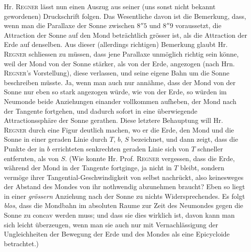 Hr. \textsc{Regner} lässt nun einen Auszug aus seiner (uns sonst nicht bekannt gewordenen) Druckschrift folgen. Das Wesentliche davon ist die Bemerkung, dass, wenn man die Parallaxe der Sonne zwischen $8''5$ und $8''9$ voraussetzt, die Attraction der Sonne auf den Mond beträchtlich grösser ist, als die Attraction der Erde auf denselben. Aus dieser (allerdings richtigen) Bemerkung glaubt Hr. \textsc{Regner} schliessen zu müssen, dass jene Parallaxe unmöglich richtig sein könne, weil der Mond von der Sonne stärker, als von der Erde, angezogen (nach Hrn. \textsc{Regner}'s Vorstellung), diese verlassen, und seine eigene Bahn um die Sonne beschreiben müsste. Ja, wenn man auch nur annähme, dass der Mond von der Sonne nur eben so stark angezogen würde, wie von der Erde, so würden im Neumonde beide Anziehungen einander vollkommen aufheben, der Mond nach der Tangente fortgehen, und dadurch sofort in eine überwiegende Attractionssphäre der Sonne gerathen. Diese letztere Behauptung will Hr. \textsc{Regner} durch eine Figur deutlich machen, wo er die Erde, den Mond und die Sonne in einer geraden Linie durch $T$, $b$, $S$ bezeichnet, und dann zeigt, dass die Punkte der in $b$ errichteten senkrechten geraden Linie sich von $T$ schneller entfernten, als von $S$. (Wie konnte Hr. Prof. \textsc{Regner} vergessen, dass die Erde, während der Mond in der Tangente fortginge, ja nicht in $T$ bleibt, sondern vermöge ihrer Tangential-Geschwindigkeit von selbst nachrückt, also keinesweges der Abstand des Mondes von ihr nothwendig abzunehmen braucht? Eben so liegt in einer \emph{grössern} Anziehung nach der Sonne zu nichts Widersprechendes. Es folgt \emph{blos}, dass die Mondbahn im absoluten Raume zur Zeit des Neumondes gegen die Sonne zu concav werden muss; und dass sie dies wirklich ist, davon kann man sich leicht überzeugen, wenn man sie auch nur mit Vernachlässigung der Ungleichheiten der Bewegung der Erde und des Mondes als eine Epicycloide betrachtet.)

